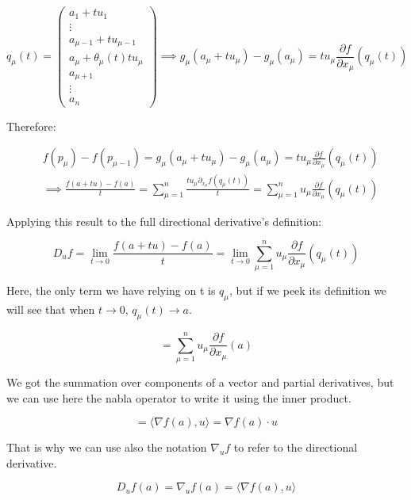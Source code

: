 \documentclass[12pt]{article}
\begin{document}
	\[
		q_\mu(t) =
		\begin{pmatrix}
			a_1 + t u_1
			\\
			\vdots
			\\
			a_{\mu - 1} + t u_{\mu - 1}
			\\
			a_\mu + \theta_\mu(t) t u_\mu
			\\
			a_{\mu + 1}
			\\
			\vdots
			\\
			a_n
		\end{pmatrix}
		\implies 	g_\mu(a_\mu + t u_\mu) - g_{\mu}(a_\mu) = tu_\mu \frac{\partial f}{\partial x_\mu}(q_\mu(t))
	\]
	
	Therefore:
	
	\[
		\begin{aligned}
			& f(p_\mu) - f(p_{\mu - 1}) = g_\mu(a_\mu + t u_\mu) - g_{\mu}(a_\mu) = tu_\mu \frac{\partial f}{\partial x_\mu}(q_\mu(t))
			\\
			& \implies \frac{f(a + tu) - f(a)}{t} = \sum_{\mu = 1}^n  \frac{tu_\mu \partial_{x_\mu} f(q_\mu(t))}{t} = \sum_{\mu = 1}^n  u_\mu \frac{\partial f}{\partial x_\mu}(q_\mu(t))
		\end{aligned}
	\]
	
	Applying this result to the full directional derivative's definition:
	
	\[
		D_u f = \lim_{t \to 0} \frac{f(a + tu) - f(a)}{t} = \lim_{t \to 0} \sum_{\mu = 1}^n  u_\mu \frac{\partial f}{\partial x_\mu}(q_\mu(t))
	\]
	
	Here, the only term we have relying on t is $q_\mu$, but if we peek its definition we will see that when $t \to 0$, $q_\mu(t) \to a$.
	
	\[
		= \sum_{\mu = 1}^n  u_\mu \frac{\partial f}{\partial x_\mu}(a)
	\]
	
	We got the summation over components of a vector and partial derivatives, but we can use here the nabla operator to write it using the inner product.
	
	\[
		= \langle \nabla f(a), u \rangle = \nabla f(a) \cdot u
	\]
	
	That is why we can use also the notation $\nabla_u f$ to refer to the directional derivative.
	
	\[
		D_u f(a) = \nabla_u f(a) = \langle \nabla f(a), u \rangle
	\]
	
	
\end{document}
